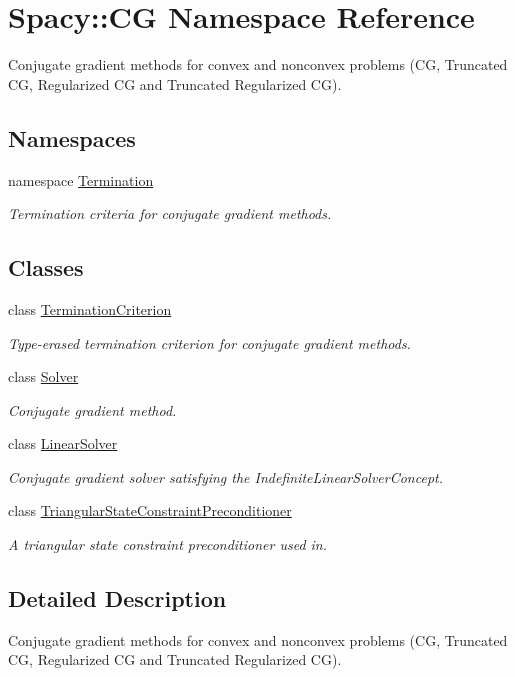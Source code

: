 \hypertarget{namespaceSpacy_1_1CG}{\section{\-Spacy\-:\-:\-C\-G \-Namespace \-Reference}
\label{namespaceSpacy_1_1CG}
}


\-Conjugate gradient methods for convex and nonconvex problems (\-C\-G, \-Truncated \-C\-G, \-Regularized \-C\-G and \-Truncated \-Regularized \-C\-G).  


\subsection*{\-Namespaces}
\begin{DoxyCompactItemize}
\item 
namespace \hyperlink{namespaceSpacy_1_1CG_1_1Termination}{\-Termination}
\begin{DoxyCompactList}\small\item\em \-Termination criteria for conjugate gradient methods. \end{DoxyCompactList}\end{DoxyCompactItemize}
\subsection*{\-Classes}
\begin{DoxyCompactItemize}
\item 
class \hyperlink{classSpacy_1_1CG_1_1TerminationCriterion}{\-Termination\-Criterion}
\begin{DoxyCompactList}\small\item\em \-Type-\/erased termination criterion for conjugate gradient methods. \end{DoxyCompactList}\item 
class \hyperlink{classSpacy_1_1CG_1_1Solver}{\-Solver}
\begin{DoxyCompactList}\small\item\em \-Conjugate gradient method. \end{DoxyCompactList}\item 
class \hyperlink{classSpacy_1_1CG_1_1LinearSolver}{\-Linear\-Solver}
\begin{DoxyCompactList}\small\item\em \-Conjugate gradient solver satisfying the \-Indefinite\-Linear\-Solver\-Concept. \end{DoxyCompactList}\item 
class \hyperlink{classSpacy_1_1CG_1_1TriangularStateConstraintPreconditioner}{\-Triangular\-State\-Constraint\-Preconditioner}
\begin{DoxyCompactList}\small\item\em \-A triangular state constraint preconditioner used in. \end{DoxyCompactList}\end{DoxyCompactItemize}


\subsection{\-Detailed \-Description}
\-Conjugate gradient methods for convex and nonconvex problems (\-C\-G, \-Truncated \-C\-G, \-Regularized \-C\-G and \-Truncated \-Regularized \-C\-G). 